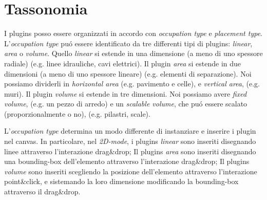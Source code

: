 \section{Tassonomia}
\label{sec:chapter_3_section_2}

\noindent
I plugins posso essere organizzati in accordo con \emph{occupation type} e \emph{placement type}.
L'\emph{occupation type} pu\'o essere identificato da tre differenti tipi di plugins: \emph{linear}, \emph{area} o \emph{volume}.
Quello \emph{linear} si estende in una dimensione (a meno di uno spessore radiale) (e.g. linee idrauliche, cavi elettrici).
Il plugin \emph{area} si estende in due dimensioni (a meno di uno spessore lineare) (e.g. elementi di separazione).
Noi possiamo dividerli in \emph{horizontal area} (e.g. pavimento e celle), e \emph{vertical area}, (e.g. muri).
Il plugin \emph{volume} si estende in tre dimensioni. Noi possiamo avere \emph{fixed volume}, (e.g. un pezzo di arredo) e
un \emph{scalable volume}, che pu\'o essere scalato (proporzionalmente o no), (e.g. pilastri, scale).


L'\emph{occupation type} determina un modo differente di instanziare e inserire i plugin nel canvas.
In particolare, nel \emph{2D-mode}, i plugins \emph{linear} sono inseriti disegnando linee attraverso l'interazione drag\&drop;
Il plugins \emph{area} sono inseriti disegnando una bounding-box dell'elemento attraverso l'interazione drag\&drop;
Il plugins \emph{volume} sono inseriti scegliendo la posizione dell'elemento attraverso l'interazione point\&click,
e sistemando la loro dimensione modificando la bounding-box attraverso il drag\&drop.

